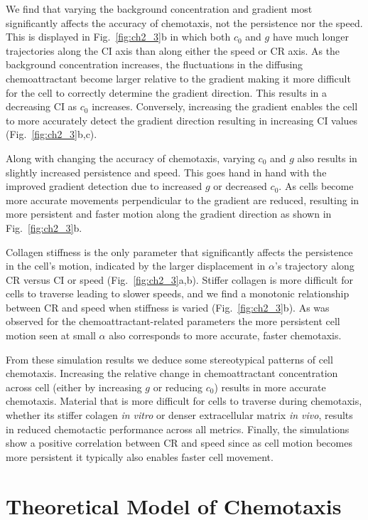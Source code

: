 We find that varying the background concentration and gradient most significantly affects the accuracy of chemotaxis, not the persistence nor the speed. This is displayed in Fig.\ \ref{fig:ch2_3}b in which both $c_0$ and $g$ have much longer trajectories along the CI axis than along either the speed or CR axis.
As the background concentration increases, the fluctuations in the diffusing chemoattractant become larger relative to the gradient making it more difficult for the cell to correctly determine the gradient direction. This results in a decreasing CI as $c_0$ increases. Conversely, increasing the gradient enables the cell to more accurately detect the gradient direction resulting in increasing CI values (Fig.\ \ref{fig:ch2_3}b,c).

Along with changing the accuracy of chemotaxis, varying $c_0$ and $g$ also results in slightly increased persistence and speed. This goes hand in hand with the improved gradient detection due to increased $g$ or decreased $c_0$. As cells become more accurate movements perpendicular to the gradient are reduced, resulting in more persistent and faster motion along the gradient direction as shown in Fig.\ \ref{fig:ch2_3}b.

Collagen stiffness is the only parameter that significantly affects the persistence in the cell's motion, indicated by the larger displacement in $\alpha$'s trajectory along CR versus CI or speed (Fig.\ \ref{fig:ch2_3}a,b). Stiffer collagen is more difficult for cells to traverse leading to slower speeds, and we find a monotonic relationship between CR and speed when stiffness is varied (Fig.\ \ref{fig:ch2_3}b). As was observed for the chemoattractant-related parameters the more persistent cell motion seen at small $\alpha$ also corresponds to more accurate, faster chemotaxis.

From these simulation results we deduce some stereotypical patterns of cell chemotaxis. Increasing the relative change in chemoattractant concentration across cell (either by increasing $g$ or reducing $c_0$) results in more accurate chemotaxis. Material that is more difficult for cells to traverse during chemotaxis, whether its stiffer colagen \textit{in vitro} or denser extracellular matrix \textit{in vivo}, results in reduced chemotactic performance across all metrics. Finally, the simulations show a positive correlation between CR and speed since as cell motion becomes more persistent it typically also enables faster cell movement.

\section{Theoretical Model of Chemotaxis}

